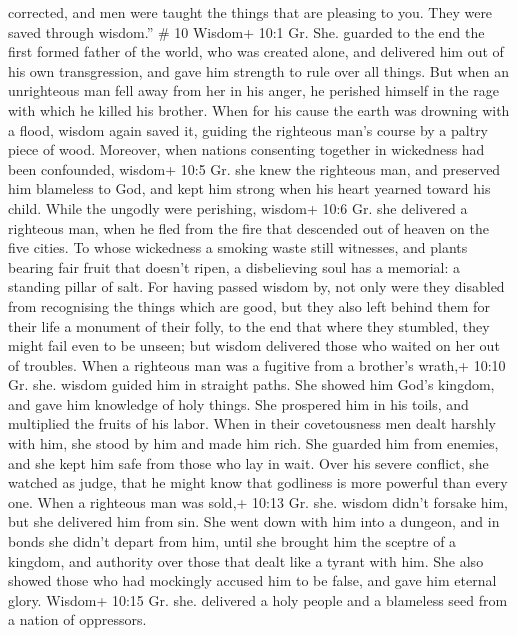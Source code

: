 corrected, and men were taught the things that are pleasing to you. They
were saved through wisdom.'' \# 10  Wisdom+ 10:1 Gr. She.
guarded to the end the first formed father of the world, who was created
alone, and delivered him out of his own transgression,  and
gave him strength to rule over all things.  But when an
unrighteous man fell away from her in his anger, he perished himself in
the rage with which he killed his brother.  When for his
cause the earth was drowning with a flood, wisdom again saved it,
guiding the righteous man's course by a paltry piece of wood.
 Moreover, when nations consenting together in wickedness
had been confounded, wisdom+ 10:5 Gr. she knew the righteous man, and
preserved him blameless to God, and kept him strong when his heart
yearned toward his child.  While the ungodly were perishing,
wisdom+ 10:6 Gr. she delivered a righteous man, when he fled from the
fire that descended out of heaven on the five cities.  To
whose wickedness a smoking waste still witnesses, and plants bearing
fair fruit that doesn't ripen, a disbelieving soul has a memorial: a
standing pillar of salt.  For having passed wisdom by, not
only were they disabled from recognising the things which are good, but
they also left behind them for their life a monument of their folly, to
the end that where they stumbled, they might fail even to be unseen;
 but wisdom delivered those who waited on her out of
troubles.  When a righteous man was a fugitive from a
brother's wrath,+ 10:10 Gr. she. wisdom guided him in straight paths.
She showed him God's kingdom, and gave him knowledge of holy things. She
prospered him in his toils, and multiplied the fruits of his labor.
 When in their covetousness men dealt harshly with him, she
stood by him and made him rich.  She guarded him from
enemies, and she kept him safe from those who lay in wait. Over his
severe conflict, she watched as judge, that he might know that godliness
is more powerful than every one.  When a righteous man was
sold,+ 10:13 Gr. she. wisdom didn't forsake him, but she delivered him
from sin. She went down with him into a dungeon,  and in
bonds she didn't depart from him, until she brought him the sceptre of a
kingdom, and authority over those that dealt like a tyrant with him. She
also showed those who had mockingly accused him to be false, and gave
him eternal glory.  Wisdom+ 10:15 Gr. she. delivered a holy
people and a blameless seed from a nation of oppressors. 

